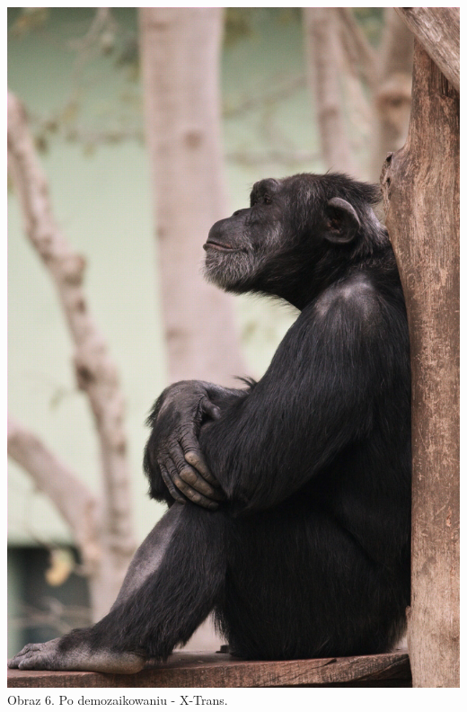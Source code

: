 \documentclass[14pt]{article}
\begin{document}
\begin{center}
    \vspace{0.5cm}
    \includegraphics[scale=0.06]{images/X_Trans_Demo.jpg}
    \\ \small Obraz 6. Po demozaikowaniu - X-Trans.


\end{center}
\end{document}
